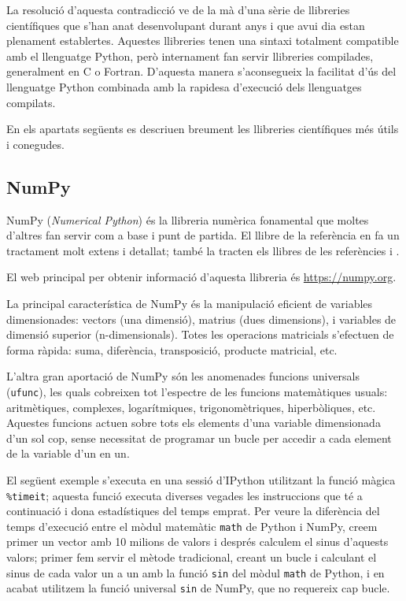 La resolució d'aquesta  contradicció ve de la mà d'una sèrie de llibreries científiques que s'han anat desenvolupant durant anys i que avui dia estan plenament establertes. Aquestes llibreries tenen una sintaxi totalment compatible amb el llenguatge Python, però internament fan servir llibreries compilades, generalment en C o Fortran. D'aquesta manera s'aconsegueix la facilitat d'ús del llenguatge Python combinada amb la rapidesa d'execució dels llenguatges compilats.

En els apartats següents es descriuen breument  les llibreries científiques més útils i conegudes.

\subsection{NumPy}

NumPy  (\textit{Numerical Python}) és la llibreria numèrica fonamental que moltes d'altres   fan servir com a base i punt de partida. El llibre de la referència \cite{VAN} en fa un tractament molt extens i detallat; també la tracten els llibres de les referències \cite{JOH} i \cite{HIL}.

El  web principal per obtenir informació d'aquesta llibreria és \href{https://numpy.org/}{https:/\!\!/numpy.org}.

La principal característica de NumPy és la manipulació eficient de variables dimensionades: vectors (una dimensió), matrius (dues dimensions), i variables de dimensió superior (n-dimensionals). Totes les operacions matricials s'efectuen de forma ràpida: suma, diferència, transposició, producte matricial, etc.

L'altra gran aportació de NumPy són les anomenades funcions universals (\texttt{ufunc}), les quals cobreixen tot l'espectre de les funcions matemàtiques usuals: aritmètiques, complexes, logarítmiques, trigonomètriques, hiperbòliques, etc. Aquestes funcions actuen sobre tots els elements d'una variable dimensionada d'un sol cop, sense necessitat de programar un bucle per accedir a cada element de la variable d'un en un. 

El següent exemple s'executa en una sessió d'IPython utilitzant la funció màgica \texttt{\%timeit}; aquesta funció executa diverses vegades les instruccions que té a continuació i dona estadístiques del temps emprat. Per veure la diferència del temps d'execució entre el mòdul matemàtic \texttt{math} de Python  i NumPy, creem primer un vector amb 10 milions de valors i després calculem el sinus d'aquests valors; primer fem servir el mètode tradicional, creant un bucle i calculant el sinus de cada valor un a un amb la funció \texttt{sin} del mòdul \texttt{math} de Python, i en acabat utilitzem la funció universal \texttt{sin} de NumPy, que no requereix cap bucle.

